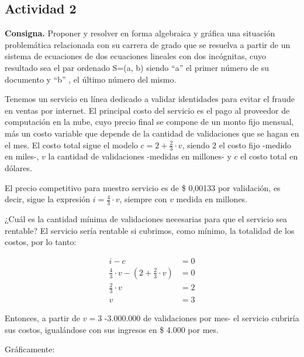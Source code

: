 \subsection*{Actividad 2}
\textbf{Consigna.}
Proponer y resolver en forma algebraica y gráfica una situación
problemática relacionada con su carrera de grado que se resuelva a
partir de un sistema de ecuaciones de dos ecuaciones lineales con
dos incógnitas, cuyo resultado sea el par ordenado S=(a, b) siendo
“a” el primer número de su documento y “b” , el último número del
mismo.

Tenemos un servicio en línea dedicado a validar identidades para evitar el fraude en ventas por internet.
El principal costo del servicio es el pago al proveedor de computación en la nube,
cuyo precio final se compone de un monto fijo mensual, 
más un costo variable que depende de la cantidad de validaciones que se hagan en el mes. 
El costo total sigue el modelo $c = 2 + \frac{2}{3} \cdot v$, 
siendo $2$ el costo fijo -medido en miles-, 
$v$ la cantidad de validaciones -medidas en millones- y $c$ el costo total en dólares.

El precio competitivo para nuestro servicio es de \$ 0,00133 por validación, es decir,
sigue la expresión $i = \frac{4}{3} \cdot v$,
siempre con \(v\) medida en millones.

¿Cuál es la cantidad mínima de validaciones necesarias para que el servicio sea rentable?
El servicio sería rentable si cubrimos, como mínimo, la totalidad de los costos, por lo tanto:

\begin{align*}
    i - c                                                       & = 0 \\
    \frac{4}{3} \cdot v - \left(2 + \frac{2}{3} \cdot v \right) & = 0 \\
    \frac{2}{3} \cdot v                                         & = 2 \\
    v                                                           & = 3
\end{align*}

Entonces, a partir de $v = 3$ -3.000.000 de validaciones por mes- el servicio cubriría sus costos, 
igualándose con sus ingresos en \$ 4.000 por mes.

Gráficamente:


